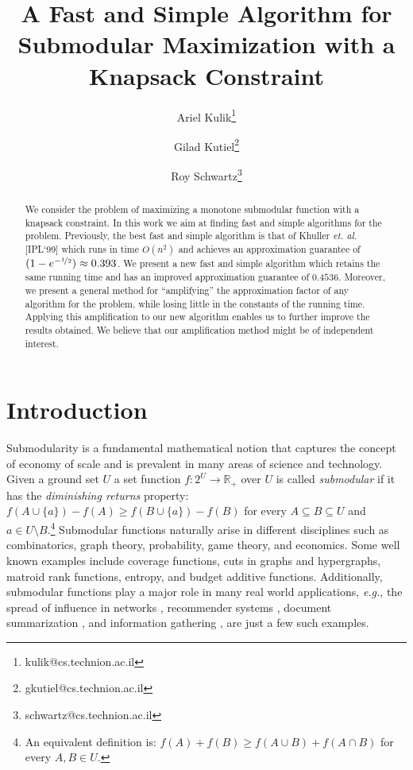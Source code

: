 \documentclass[a4paper]{article}
\title{A Fast and Simple Algorithm for Submodular Maximization with a Knapsack Constraint}
\author[1]{Ariel Kulik\thanks{kulik@cs.technion.ac.il}}
\author[1]{Gilad Kutiel\thanks{gkutiel@cs.technion.ac.il}}
\author[1]{Roy Schwartz\thanks{schwartz@cs.technion.ac.il}}
\affil[1]{Department of Computer Science, Technion, Haifa, Israel}
\begin{document}
\maketitle

\begin{abstract}
We consider the problem of maximizing a monotone submodular function with a knapsack constraint.
In this work we aim at finding fast and simple algorithms for the problem.
Previously, the best fast and simple algorithm is that of Khuller {\em et. al.} [IPL`99] which runs in time $O(n^2)$ and achieves an approximation guarantee of $(1-e^{-\nicefrac[]{1}{2}})\approx 0.393 $.
We present a new fast and simple algorithm which retains the same running time and has an improved approximation guarantee of $0.4536$.
Moreover, we present a general method for ``amplifying'' the approximation factor of any algorithm for the problem, while losing little in the constants of the running time.
Applying this amplification to our new algorithm enables us to further improve the results obtained.
We believe that our amplification method might be of independent interest.

\end{abstract}

\section{Introduction}
Submodularity is a fundamental mathematical notion that captures the concept of economy of scale and is prevalent in many areas of science and technology.
Given a ground set $U$ a set function $f:2^U \to \mathbb{R}_+$ over $U$ is called \emph{submodular} if it has the \emph{diminishing returns} property:
$f(A \cup \{a\}) - f(A) \geq f(B \cup \{a\}) - f(B)$ for every $A \subseteq B \subseteq U$ and $a \in U \setminus B$.\footnote{
    An equivalent definition is: $f(A) + f(B) \geq f(A \cup B) + f(A \cap B)$ for every $A,B \in U$.
}
Submodular functions naturally arise in different disciplines such as combinatorics, graph theory, probability, game theory, and economics.
Some well known examples include coverage functions, cuts in graphs and hypergraphs, matroid rank functions, entropy, and budget additive functions.
Additionally, submodular functions play a major role in many real world applications, {\em e.g.}, the spread of influence in networks \cite{KKT03,KKT05,KKT15,MR10}, recommender systems \cite{EG11,EVSG09}, document summarization \cite{DKR13,LB10,LB11}, and information gathering \cite{GKS05,KG11,KGGK06,KGGK11,KSG08}, are just a few such examples.
\end{document}
